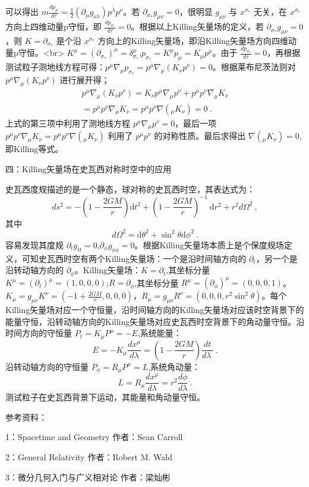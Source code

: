 可以得出 $m\frac{d p_{\mu}}{d \tau}=\frac{1}{2}\left(\partial_{\mu} g_{\nu \lambda}\right) p^{\lambda} p^{\nu}$。若 $\partial_{\sigma_{*}} g_{\mu \nu}=0$，很明显 $g_{\mu \nu}$ 与 $x^{\sigma_{*}}$ 无关，在 $x^{\sigma_{*}}$ 方向上四维动量p守恒，即 $\frac{d p_{\sigma_{*}}}{d \tau}=0$。根据以上Killing矢量场的定义，若 $\partial_{\sigma_{*}} g_{\mu \nu}=0$，则 $K=\partial_{\sigma_{*}}$ 是个沿 $x^{\sigma_{*}}$ 方向上的Killing矢量场，即沿Killing矢量场方向四维动量p守恒。<br>
$K^{\mu}=(\partial_{\sigma_{*}})^{\mu}=\delta_{\sigma_{*}}^{\mu}$,$p_{\sigma_{*}}=K^{\mu}p_{\mu}=K_{\mu}p^{\mu}$。由于 $\frac{d p_{\sigma_{*}}}{d \tau}=0$，再根据测试粒子测地线方程可得：$p^{\mu} \nabla_{\mu} p_{\sigma_{*}}=p^{\mu} \nabla_{\mu}(K_{\nu}p^{\nu}) =0$。根据莱布尼茨法则对 $p^{\mu} \nabla_{\mu}(K_{\nu}p^{\nu})$ 进行展开得；
$$\begin{aligned}
p^{\mu} \nabla_{\mu}(K_{\nu}p^{\nu})=K_{\nu}p^{\mu} \nabla_{\mu}p^{\nu}+p^{\mu} p^{\nu}\nabla_{\mu}K_{\nu}\\
=p^{\mu} p^{\nu}\nabla_{\mu}K_{\nu}=p^{\mu} p^{\nu}\nabla(_{\mu}K_{\nu})=0~.
\end{aligned}$$
上式的第三项中利用了测地线方程 $p^{\mu} \nabla_{\mu}p^{\nu}=0$，最后一项 $p^{\mu} p^{\nu}\nabla_{\mu}K_{\nu}=p^{\mu} p^{\nu}\nabla(_{\mu}K_{\nu})$ 利用了 $p^{\mu} p^{\nu}$ 的对称性质。最后求得出 $\nabla(_{\mu}K_{\nu})=0$,即Killing等式。

四：Killing矢量场在史瓦西对称时空中的应用

史瓦西度规描述的是一个静态，球对称的史瓦西时空，其表达式为：
$$d s^{2}=-\left(1-\frac{2 G M}{r}\right) \mathrm{d} t^{2}+\left(1-\frac{2 G M}{r}\right)^{-1} \mathrm{~d} r^{2}+r^{2} d \Omega^{2}~,$$其中$$d \Omega^{2}=\mathrm{d} \theta^{2}+\sin ^{2} \theta \mathrm{d} \phi^{2}~.$$
容易发现其度规 $\partial_{t} g_{tt}=0$,$\partial_{\phi} g_{\phi\phi}=0$。根据Killing矢量场本质上是个保度规场定义，可知史瓦西时空有两个Killing矢量场：一个是沿时间轴方向的 $\partial_{t}$，另一个是沿转动轴方向的 $\partial_{\phi}$。Killing矢量场：$K=\partial_{t}$,其坐标分量 $K^{\mu}=\left(\partial_{t}\right)^{\mu}=(1,0,0,0)$;$R=\partial_{\phi}$,其坐标分量 $R^{\mu}=\left(\partial_{\phi}\right)^{\mu}=(0,0,0,1)$。$K_{\mu}=g_{\mu \nu}K^{\nu}=(-1+\frac{2 G M}{r},0,0,0)$，$R_{\mu}=g_{\mu \nu}R^{\nu}=(0,0,0,r^{2}\sin ^{2} \theta )$。每个Killing矢量场对应一个守恒量，沿时间轴方向的Killing矢量场对应该时空背景下的能量守恒，沿转动轴方向的Killing矢量场对应史瓦西时空背景下的角动量守恒。沿时间方向的守恒量 $P_{t}=K_{\mu}P^{\mu}=-E$,系统能量：$$E=-K_{\mu} \frac{d x^{\mu}}{d \lambda}=\left(1-\frac{2 G M}{r}\right) \frac{d t}{d \lambda~}~.$$
沿转动轴方向的守恒量 $P_{\phi}=R_{\mu}P^{\mu}=L$,系统角动量：$$L=R_{\mu} \frac{d x^{\mu}}{d \lambda}=r^{2} \frac{d \phi}{d \lambda}~.$$
测试粒子在史瓦西背景下运动，其能量和角动量守恒。

参考资料：

1：Spacetime and Geometry 作者：Sean Carroll

2：General Relativity   作者：Robert M. Wald

3：微分几何入门与广义相对论  作者：梁灿彬